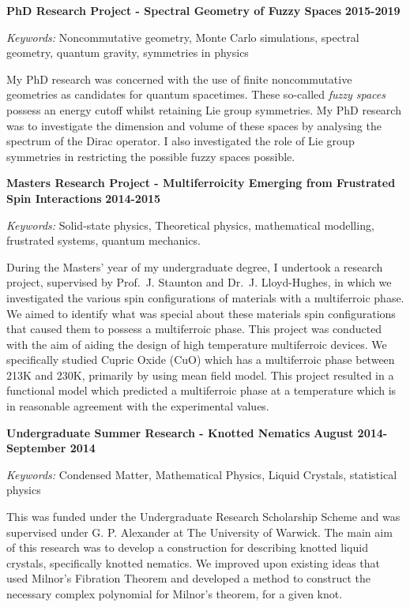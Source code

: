 \documentclass[10pt]{article}
\begin{document}
\textbf{PhD Research Project - Spectral Geometry of Fuzzy Spaces}
\hfill \textbf{2015-2019}

\emph{Keywords:} Noncommutative geometry, Monte Carlo simulations,
spectral geometry, quantum gravity, symmetries in physics

My PhD research was concerned with the use of finite noncommutative
geometries as candidates for quantum spacetimes. These so-called
\emph{fuzzy spaces} possess an energy cutoff whilst retaining Lie group
symmetries. My PhD research was to investigate the dimension and volume
of these spaces by analysing the spectrum of the Dirac operator. I also
investigated the role of Lie group symmetries in restricting the
possible fuzzy spaces possible.

\textbf{Masters Research Project - Multiferroicity Emerging from
Frustrated Spin Interactions} \hfill \textbf{2014-2015}

\emph{Keywords:} Solid-state physics, Theoretical physics, mathematical
modelling, frustrated systems, quantum mechanics.

During the Masters' year of my undergraduate degree, I undertook a
research project, supervised by Prof.~J. Staunton and Dr.~J.
Lloyd-Hughes, in which we investigated the various spin configurations
of materials with a multiferroic phase. We aimed to identify what was
special about these materials spin configurations that caused them to
possess a multiferroic phase. This project was conducted with the aim of
aiding the design of high temperature multiferroic devices. We
specifically studied Cupric Oxide (CuO) which has a multiferroic phase
between 213K and 230K, primarily by using mean field model. This project
resulted in a functional model which predicted a multiferroic phase at a
temperature which is in reasonable agreement with the experimental
values.

\textbf{Undergraduate Summer Research - Knotted Nematics}
\hfill \textbf{August 2014-September 2014}

\emph{Keywords:} Condensed Matter, Mathematical Physics, Liquid
Crystals, statistical physics

This was funded under the Undergraduate Research Scholarship Scheme and
was supervised under G. P. Alexander at The University of Warwick. The
main aim of this research was to develop a construction for describing
knotted liquid crystals, specifically knotted nematics. We improved upon
existing ideas that used Milnor's Fibration Theorem and developed a
method to construct the necessary complex polynomial for Milnor's
theorem, for a given knot.
\end{document}
